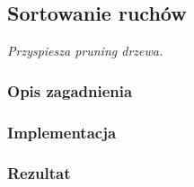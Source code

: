 \subsection{Sortowanie ruchów}
\label{subsec:sortowanie-ruchow}
\textit{Przyspiesza pruning drzewa.}


\subsubsection{Opis zagadnienia}
\subsubsection{Implementacja}
\subsubsection{Rezultat}